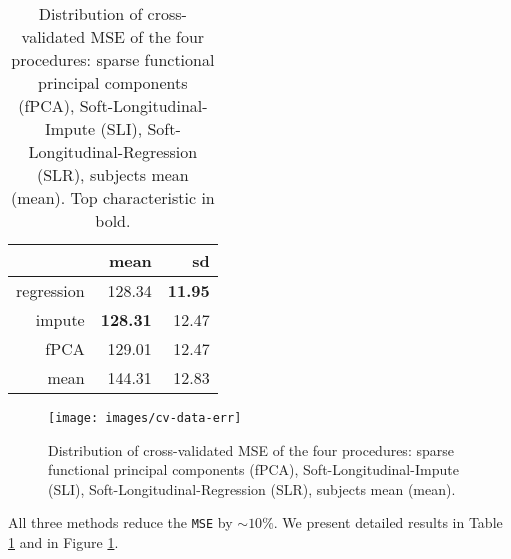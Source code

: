 \documentclass[preprint]{imsart}
\numberwithin{equation}{section}
\theoremstyle{plain}
\DeclareMathOperator*{\diag}{diag}
\begin{document}
\begin{table}[ht]
\centering
\begin{tabular}{rrr}
  \hline
 & mean & sd \\ 
  \hline
regression & 128.34 & \textbf{11.95} \\ 
  impute & \textbf{128.31} & 12.47 \\ 
  fPCA & 129.01 & 12.47 \\ 
  mean & 144.31 & 12.83 \\ 
   \hline
\end{tabular}\label{tbl:data-res}
\caption{Distribution of cross-validated MSE of the four procedures: sparse functional principal components (fPCA), Soft-Longitudinal-Impute (SLI), Soft-Longitudinal-Regression (SLR), subjects mean (mean). Top characteristic in bold.}
\end{table}

\begin{figure}[h]
  \texttt{[image: images/cv-data-err]}
  \caption{Distribution of cross-validated MSE of the four procedures: sparse functional principal components (fPCA), Soft-Longitudinal-Impute (SLI), Soft-Longitudinal-Regression (SLR), subjects mean (mean).}
  \label{fig:Boxplots}
\end{figure}

All three methods reduce the \verb|MSE| by $\sim 10\%$. We present detailed results in Table \ref{tbl:data-res} and in Figure \ref{fig:Boxplots}. 




\end{document}
